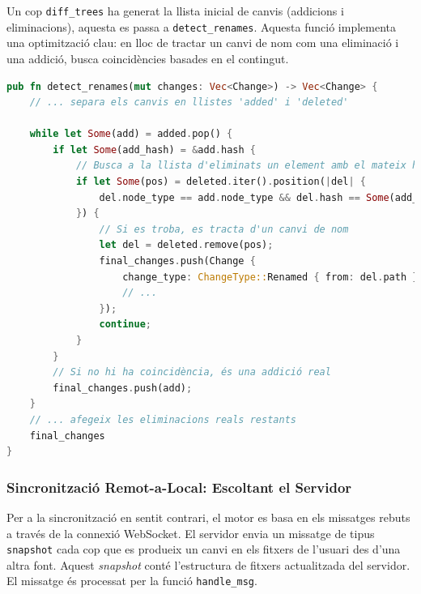 Un cop \texttt{diff\_trees} ha generat la llista inicial de canvis (addicions i eliminacions), aquesta es passa a \texttt{detect\_renames}. Aquesta funció implementa una optimització clau: en lloc de tractar un canvi de nom com una eliminació i una addició, busca coincidències basades en el contingut.

\begin{lstlisting}[language=rust, caption={Fragment clau de \texttt{detect\_renames} a \texttt{fstree.rs}}]
pub fn detect_renames(mut changes: Vec<Change>) -> Vec<Change> {
    // ... separa els canvis en llistes 'added' i 'deleted'
    
    while let Some(add) = added.pop() {
        if let Some(add_hash) = &add.hash {
            // Busca a la llista d'eliminats un element amb el mateix hash
            if let Some(pos) = deleted.iter().position(|del| {
                del.node_type == add.node_type && del.hash == Some(add_hash.clone())
            }) {
                // Si es troba, es tracta d'un canvi de nom
                let del = deleted.remove(pos);
                final_changes.push(Change {
                    change_type: ChangeType::Renamed { from: del.path },
                    // ...
                });
                continue;
            }
        }
        // Si no hi ha coincidència, és una addició real
        final_changes.push(add);
    }
    // ... afegeix les eliminacions reals restants
    final_changes
}
\end{lstlisting}

\subsubsection{Sincronització Remot-a-Local: Escoltant el Servidor}
Per a la sincronització en sentit contrari, el motor es basa en els missatges rebuts a través de la connexió WebSocket. El servidor envia un missatge de tipus \texttt{snapshot} cada cop que es produeix un canvi en els fitxers de l'usuari des d'una altra font. Aquest \textit{snapshot} conté l'estructura de fitxers actualitzada del servidor. El missatge és processat per la funció \texttt{handle\_msg}.

